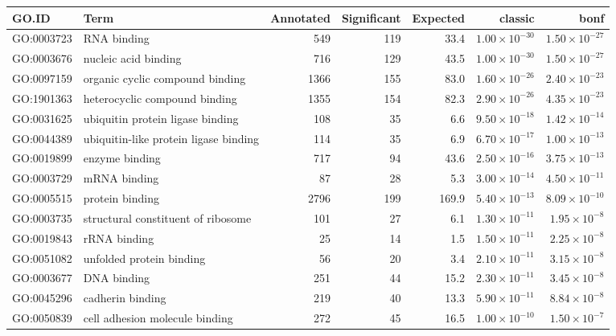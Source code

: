 \begin{table}[ht]
\centering
\begin{adjustbox}{width=\textwidth}

\begin{tabular}{llrrrrr}
  \hline
GO.ID & Term & Annotated & Significant & Expected & classic & bonf \\ 
  \hline
GO:0003723 & RNA binding & 549 & 119 & 33.4 & $1.00 \times 10^{-30}$ & $1.50 \times 10^{-27}$ \\ 
  GO:0003676 & nucleic acid binding & 716 & 129 & 43.5 & $1.00 \times 10^{-30}$ & $1.50 \times 10^{-27}$ \\ 
  GO:0097159 & organic cyclic compound binding & 1366 & 155 & 83.0 & $1.60 \times 10^{-26}$ & $2.40 \times 10^{-23}$ \\ 
  GO:1901363 & heterocyclic compound binding & 1355 & 154 & 82.3 & $2.90 \times 10^{-26}$ & $4.35 \times 10^{-23}$ \\ 
  GO:0031625 & ubiquitin protein ligase binding & 108 & 35 & 6.6 & $9.50 \times 10^{-18}$ & $1.42 \times 10^{-14}$ \\ 
  GO:0044389 & ubiquitin-like protein ligase binding & 114 & 35 & 6.9 & $6.70 \times 10^{-17}$ & $1.00 \times 10^{-13}$ \\ 
  GO:0019899 & enzyme binding & 717 & 94 & 43.6 & $2.50 \times 10^{-16}$ & $3.75 \times 10^{-13}$ \\ 
  GO:0003729 & mRNA binding & 87 & 28 & 5.3 & $3.00 \times 10^{-14}$ & $4.50 \times 10^{-11}$ \\ 
  GO:0005515 & protein binding & 2796 & 199 & 169.9 & $5.40 \times 10^{-13}$ & $8.09 \times 10^{-10}$ \\ 
  GO:0003735 & structural constituent of ribosome & 101 & 27 & 6.1 & $1.30 \times 10^{-11}$ & $1.95 \times 10^{-8}$ \\ 
  GO:0019843 & rRNA binding & 25 & 14 & 1.5 & $1.50 \times 10^{-11}$ & $2.25 \times 10^{-8}$ \\ 
  GO:0051082 & unfolded protein binding & 56 & 20 & 3.4 & $2.10 \times 10^{-11}$ & $3.15 \times 10^{-8}$ \\ 
  GO:0003677 & DNA binding & 251 & 44 & 15.2 & $2.30 \times 10^{-11}$ & $3.45 \times 10^{-8}$ \\ 
  GO:0045296 & cadherin binding & 219 & 40 & 13.3 & $5.90 \times 10^{-11}$ & $8.84 \times 10^{-8}$ \\ 
  GO:0050839 & cell adhesion molecule binding & 272 & 45 & 16.5 & $1.00 \times 10^{-10}$ & $1.50 \times 10^{-7}$ \\ 

\end{tabular}
\end{adjustbox}
\end{table}
